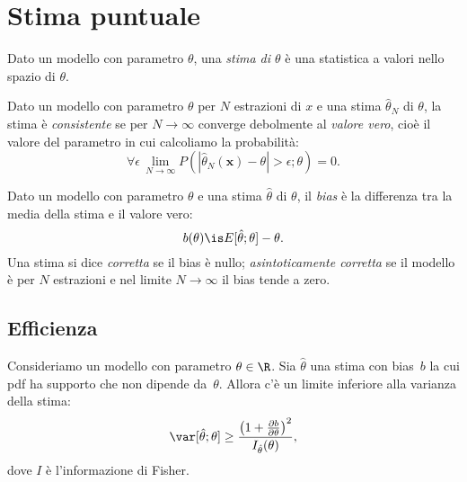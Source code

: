 
\section{Stima puntuale}

\begin{definition}[Stima]
	Dato un modello con parametro $\theta$,
	una \emph{stima di $\theta$} è una statistica a valori nello spazio di $\theta$.
\end{definition}

\begin{definition}[Consistenza]
	Dato un modello con parametro $\theta$ per $N$ estrazioni di $x$
	e una stima $\hat\theta_N$ di $\theta$,
	la stima è \emph{consistente}
	se per $N\to\infty$ converge debolmente al \emph{valore vero},
	cioè il valore del parametro in cui calcoliamo la probabilità:
	\begin{equation*}
		\forall\epsilon\, \lim_{N\to\infty} P(|\hat\theta_N(\mathbf x)-\theta| > \epsilon;\theta) = 0.
	\end{equation*}
\end{definition}

\begin{definition}[Bias]
	Dato un modello con parametro $\theta$ e una stima $\hat\theta$ di $\theta$,
	il \emph{bias} è la differenza tra la media della stima e il valore vero:
	\begin{equation*}
		b(\theta) \is E[\hat\theta;\theta] - \theta.
	\end{equation*}
	Una stima si dice \emph{corretta} se il bias è nullo;
	\emph{asintoticamente corretta} se il modello è per $N$ estrazioni
	e nel limite $N\to\infty$ il bias tende a zero.
\end{definition}

\subsection{Efficienza}

\begin{theorem}
	\label{th:cramerrao}
	Consideriamo un modello con parametro $\theta\in\R$.
	Sia $\hat\theta$ una stima con bias~$b$
	la cui pdf ha supporto che non dipende da~$\theta$.
	Allora c'è un limite inferiore alla varianza della stima:
	\begin{equation*}
		\var[\hat\theta;\theta] \ge \frac{\left( 1 + \frac{\partial b}{\partial\theta} \right)^2}{I_{\hat\theta}(\theta)},
	\end{equation*}
	dove $I$ è l'informazione di Fisher.
\end{theorem}

